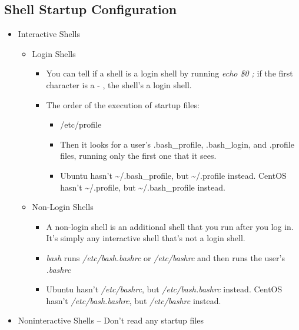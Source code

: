 \documentclass[titlepage]{article}
\begin{document}
      \subsection{Shell Startup Configuration}
        \begin{itemize}
        	\item Interactive Shells
        	  \begin{itemize}
        	  	\item Login Shells
        	  	  \begin{itemize}
        	  	  	\item You can tell if a shell is a login shell by running \emph{echo \$0 ;} if the first character is a - , the shell’s a login shell.
        	  	  	\item The order of the execution of startup files:
        	  	  	  \begin{itemize}
        	  	  	  	\item /etc/profile
        	  	  	  	\item Then it looks for a user’s .bash\_profile, .bash\_login, and .profile files, running only the first one that it sees.
        	  	  	  	\item Ubuntu hasn't \textasciitilde/.bash\_profile, but \textasciitilde/.profile instead. CentOS hasn't \textasciitilde/.profile, but \textasciitilde/.bash\_profile instead.
        	  	  	  \end{itemize}
        	  	  \end{itemize}
          	    \item Non-Login Shells
          	      \begin{itemize}
          	      	\item A non-login shell is an additional shell that you run after you log in. It’s
          	      	simply any interactive shell that’s not a login shell.
          	      	\item \emph{bash} runs \emph{/etc/bash.bashrc} or \emph{/etc/bashrc} and then runs the user’s \emph{.bashrc}
          	      	\item Ubuntu hasn't \emph{/etc/bashrc}, but \emph{/etc/bash.bashrc} instead. CentOS hasn't \emph{/etc/bash.bashrc}, but \emph{/etc/bashrc} instead.
          	      \end{itemize}
        	  \end{itemize}
        	\item Noninteractive Shells -- Don't read any startup files
        \end{itemize}
    
\end{document}
